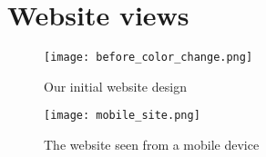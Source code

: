 \chapter{Website views}\label{appendix:websiteViews}

\begin{figure}[h!]
    \centering
	\texttt{[image: before\_color\_change.png]}
	\caption{Our initial website design}
	\label{fig:old_website_design}
\end{figure}

\begin{figure}[h!]
    \centering
	\texttt{[image: mobile\_site.png]}
	\caption{The website seen from a mobile device}
	\label{fig:mobileView}
\end{figure}
